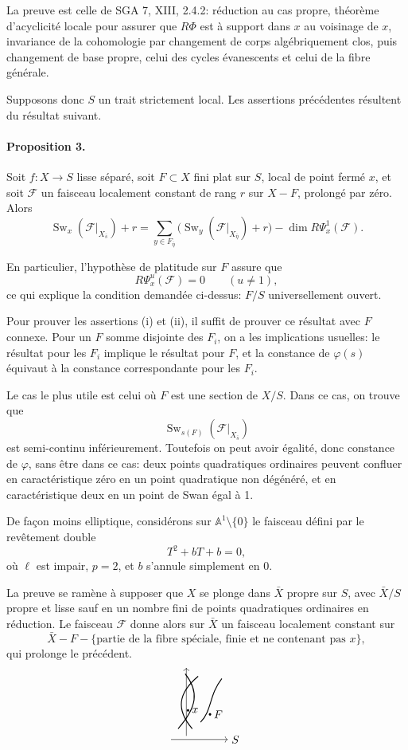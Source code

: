 \documentclass[11pt]{article}
\newcommand{\semistableSketch}{%
\begin{tikzpicture}[scale=.75,baseline=-.5ex]
  \draw[->] (-.2,0) -- (2.2,0) node[right]{$S$};
  \draw[->] (.45,.15) -- (.45,3.0);
  \draw[thick] (.1,.45) .. controls (.9,1.35) and (1.0,2.0) .. (.4,2.75);
  \draw[thick] (.7,.45) .. controls (.0,1.25) and (.1,1.95) .. (.95,2.65);
  \draw[thick] (1.05,.72) .. controls (1.55,1.25) and (1.4,1.85) .. (1.95,2.55);
  \fill (.52,1.22) circle (1.5pt) node[right]{$x$};
  \fill (1.45,1.05) circle (1.5pt) node[right]{$F$};
\end{tikzpicture}%
}
\newcommand{\F}{\mathcal F}
\DeclareMathOperator{\Sw}{Sw}
\begin{document}
La preuve est celle de SGA 7, XIII, 2.4.2: réduction au cas propre, théorème d'acyclicité locale pour assurer que \(R\Phi\) est à support dans \(x\) au voisinage de \(x\), invariance de la cohomologie par changement de corps algébriquement clos, puis changement de base propre, celui des cycles évanescents et celui de la fibre générale.

Supposons donc \(S\) un trait strictement local. Les assertions précédentes résultent du résultat suivant.

\paragraph{Proposition 3.}
Soit \(f:X\to S\) lisse séparé, soit \(F\subset X\) fini plat sur \(S\), local de point fermé \(x\), et soit \(\F\) un faisceau localement constant de rang \(r\) sur \(X-F\), prolongé par zéro. Alors
\[
\Sw_x(\F|_{X_{\bar s}})+r
=
\sum_{y\in F_{\bar\eta}}
\bigl(\Sw_y(\F|_{X_{\bar\eta}})+r\bigr)
-
\dim R\Psi_x^1(\F).
\]

En particulier, l'hypothèse de platitude sur \(F\) assure que
\[
  R\Psi_x^u(\F)=0\qquad (u\ne 1),
\]
ce qui explique la condition demandée ci-dessus: \(F/S\) universellement ouvert.

Pour prouver les assertions (i) et (ii), il suffit de prouver ce résultat avec \(F\) connexe. Pour un \(F\) somme disjointe des \(F_i\), on a les implications usuelles: le résultat pour les \(F_i\) implique le résultat pour \(F\), et la constance de \(\varphi(s)\) équivaut à la constance correspondante pour les \(F_i\).

Le cas le plus utile est celui où \(F\) est une section de \(X/S\). Dans ce cas, on trouve que
\[
  \Sw_{s(F)}(\F|_{X_{\bar s}})
\]
est semi-continu inférieurement. Toutefois on peut avoir égalité, donc constance de \(\varphi\), sans être dans ce cas: deux points quadratiques ordinaires peuvent confluer en caractéristique zéro en un point quadratique non dégénéré, et en caractéristique deux en un point de Swan égal à 1.

De façon moins elliptique, considérons sur \(\mathbb A^1\setminus\{0\}\) le faisceau défini par le revêtement double
\[
  T^2+bT+b=0,
\]
où \(\ell\) est impair, \(p=2\), et \(b\) s'annule simplement en \(0\).

La preuve se ramène à supposer que \(X\) se plonge dans \(\bar X\) propre sur \(S\), avec \(\bar X/S\) propre et lisse sauf en un nombre fini de points quadratiques ordinaires en réduction. Le faisceau \(\F\) donne alors sur \(\bar X\) un faisceau localement constant sur
\[
  \bar X-F-\{
  \text{partie de la fibre spéciale, finie et ne contenant pas }x
  \},
\]
qui prolonge le précédent.
\[
\semistableSketch
\]
\end{document}

